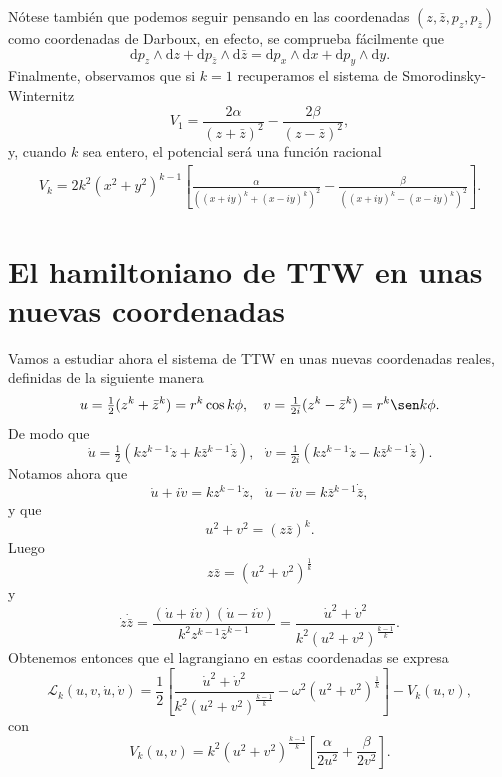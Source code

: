 \documentclass[11pt,a4paper,twoside]{article}
\theoremstyle{definition} \newtheorem{defn}[thm]{Definición}
\theoremstyle{definition} \newtheorem{ejemplo}[thm]{Ejemplo}
\theoremstyle{definition} \newtheorem{ejercicio}[thm]{Ejercicio}
\theoremstyle{remark} \newtheorem*{obs}{Observación}
\def\dd{\mathrm{d}}
\def\zz{\bar{z}}
\begin{document}
Nótese también que podemos seguir pensando en las coordenadas $(z,\zz,p_z,p_{\zz})$ como coordenadas de Darboux, en efecto, se comprueba fácilmente que
\begin{equation}
  \dd p_z \wedge \dd z + \dd p_{\zz} \wedge \dd \zz=\dd p_x \wedge \dd x + \dd p_y \wedge \dd y.
\end{equation}
Finalmente, observamos que si $k=1$ recuperamos el sistema de Smorodinsky-Winternitz
\begin{equation}
  V_1=\frac{2\alpha}{(z+\zz)^2}-\frac{2\beta}{(z-\zz)^2},
\end{equation}
y, cuando $k$ sea entero, el potencial será una función racional
\begin{align}
  V_k=2k^2(x^2+y^2)^{k-1}\left[ \frac{\alpha}{\left( (x+iy)^k+(x-iy)^k \right)^2}-\frac{\beta}{\left( (x+iy)^k-(x-iy)^k \right)^2} \right].
\end{align}

\section{El hamiltoniano de TTW en unas nuevas coordenadas}\label{nuevascoordenadas}
Vamos a estudiar ahora el sistema de TTW en unas nuevas coordenadas reales, definidas de la siguiente manera
\begin{equation}\label{nuevas}
    u=\tfrac{1}{2}(z^k+\zz^k)=r^k\cos k\phi, \ \ \
    v=\tfrac{1}{2i}(z^k-\zz^k)=r^k \sen k\phi.
\end{equation}
De modo que
\begin{equation}
  \dot{u}=\tfrac{1}{2}(kz^{k-1}\dot{z}+k\zz^{k-1}\dot{\zz}),\ \ \
  \dot{v}=\tfrac{1}{2i}(kz^{k-1}\dot{z}-k\zz^{k-1}\dot{\zz}).
\end{equation}
Notamos ahora que 
\begin{equation*}
    \dot{u}+i\dot{v}=kz^{k-1}\dot{z},\ \ \
    \dot{u}-i\dot{v}=k\zz^{k-1}\dot{\zz},
\end{equation*}
y que
\begin{equation*}
  u^2+v^2=(z\zz)^k.
\end{equation*}
Luego
\begin{equation*}
  z\zz=(u^2+v^2)^{\frac{1}{k}}
\end{equation*}
y
\begin{equation*}
    \dot{z}\dot{\zz}=\frac{(\dot{u}+i\dot{v})(\dot{u}-i\dot{v})}{k^2z^{k-1}\zz^{k-1}}=\frac{\dot{u}^2+\dot{v}^2}{k^2(u^2+v^2)^{\frac{k-1}{k}}}.
\end{equation*}
Obtenemos entonces que el lagrangiano en estas coordenadas se expresa
\begin{equation}
  \mathcal{L}_k(u,v,\dot{u},\dot{v})=\frac{1}{2}\left[ \frac{\dot{u}^2+\dot{v}^2}{k^2(u^2+v^2)^{\frac{k-1}{k}}} -\omega^2(u^2+v^2)^{\frac{1}{k}}\right]-V_k(u,v),
\end{equation}
con
\begin{equation}
  V_k(u,v)=k^2(u^2+v^2)^{\frac{k-1}{k}}\left[ \frac{\alpha}{2u^2}+\frac{\beta}{2v^2} \right].
\end{equation}
\end{document}
